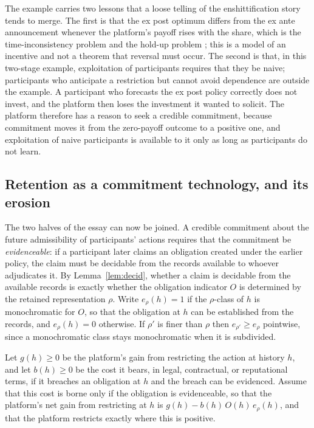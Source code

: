 \documentclass[11pt]{article}
\theoremstyle{definition}
\theoremstyle{remark}
\begin{document}
The example carries two lessons that a loose telling of the enshittification story tends to merge. The first is that the ex post optimum differs from the ex ante announcement whenever the platform's payoff rises with the share, which is the time-inconsistency problem \cite{kp} and the hold-up problem \cite{kca}; this is a model of an incentive and not a theorem that reversal must occur. The second is that, in this two-stage example, exploitation of participants requires that they be naive; participants who anticipate a restriction but cannot avoid dependence are outside the example. A participant who forecasts the ex post policy correctly does not invest, and the platform then loses the investment it wanted to solicit. The platform therefore has a reason to seek a credible commitment, because commitment moves it from the zero-payoff outcome to a positive one, and exploitation of naive participants is available to it only as long as participants do not learn.

\subsection{Retention as a commitment technology, and its erosion}

The two halves of the essay can now be joined. A credible commitment about the future admissibility of participants' actions requires that the commitment be \emph{evidenceable}: if a participant later claims an obligation created under the earlier policy, the claim must be decidable from the records available to whoever adjudicates it. By Lemma~\ref{lem:decid}, whether a claim is decidable from the available records is exactly whether the obligation indicator $O$ is determined by the retained representation $\rho$. Write $e_\rho(h)=1$ if the $\rho$-class of $h$ is monochromatic for $O$, so that the obligation at $h$ can be established from the records, and $e_\rho(h)=0$ otherwise. If $\rho'$ is finer than $\rho$ then $e_{\rho'}\ge e_\rho$ pointwise, since a monochromatic class stays monochromatic when it is subdivided.

Let $g(h)\ge0$ be the platform's gain from restricting the action at history $h$, and let $b(h)\ge0$ be the cost it bears, in legal, contractual, or reputational terms, if it breaches an obligation at $h$ and the breach can be evidenced. Assume that this cost is borne only if the obligation is evidenceable, so that the platform's net gain from restricting at $h$ is $g(h)-b(h)\,O(h)\,e_\rho(h)$, and that the platform restricts exactly where this is positive.
\end{document}
